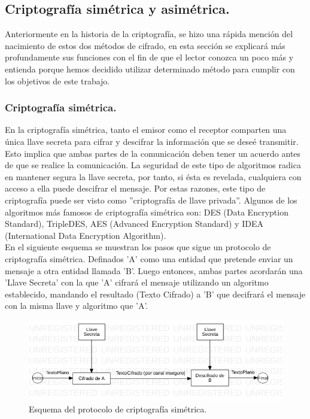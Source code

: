 \documentclass[12pt, a4paper, titlepage]{report}
\begin{document}
            \subsection{Criptografía simétrica y asimétrica.}
                Anteriormente en la historia de la criptografía, se hizo una rápida mención del nacimiento de estos dos métodos de cifrado, en esta sección se explicará más profundamente sus funciones con el fin de que el lector conozca un poco más y entienda porque hemos decidido utilizar determinado método para cumplir con los objetivos de este trabajo.
                
                \subsubsection{Criptografía simétrica.}
                En la criptografía simétrica, tanto el emisor como el receptor comparten una única llave secreta para cifrar y descifrar la información que se deseé transmitir. Esto implica que ambas partes de la comunicación deben tener un acuerdo antes de que se realice la comunicación. La seguridad de este tipo de algoritmos radica en mantener segura la llave secreta, por tanto, si ésta es revelada, cualquiera con acceso a ella puede descifrar el mensaje. Por estas razones, este tipo de criptografía puede ser visto como ''criptografía de llave privada''. Algunos de los algoritmos más famosos de criptografía simétrica son: DES (Data Encryption Standard), TripleDES, AES (Advanced Encryption Standard) y IDEA (International Data Encryption Algorithm).\cite{refChaffing}\\
                En el siguiente esquema se muestran los pasos que sigue un protocolo de criptografía simétrica. Definados 'A' como una entidad que pretende enviar un mensaje a otra entidad llamada 'B'. Luego entonces, ambas partes acordarán una 'Llave Secreta' con la que 'A' cifrará el mensaje utilizando un algoritmo establecido, mandando el resultado (Texto Cifrado) a 'B' que decifrará el mensaje con la misma llave y algoritmo que 'A'.
                
                \begin{figure}[H]
        			\begin{center}	                  \includegraphics[width=14cm]{./imagenes/MarcoTeorico/cripto_simetrica.png}
        				\caption{Esquema del protocolo de criptografía simétrica.}
        			\end{center}
        		\end{figure}
        		
\end{document}
